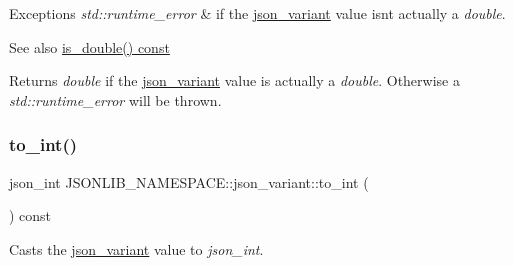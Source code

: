\begin{DoxyExceptions}{Exceptions}
{\em std\+::runtime\+\_\+error} & if the \hyperlink{classJSONLIB__NAMESPACE_1_1json__variant}{json\+\_\+variant} value isn\textquotesingle{}t actually a {\itshape double}. \\
\hline
\end{DoxyExceptions}
\begin{DoxySeeAlso}{See also}
\hyperlink{classJSONLIB__NAMESPACE_1_1json__variant_a7f294ce9b078aca12e0f96df7275ff0b}{is\+\_\+double() const} 
\end{DoxySeeAlso}
\begin{DoxyReturn}{Returns}
{\itshape double} if the \hyperlink{classJSONLIB__NAMESPACE_1_1json__variant}{json\+\_\+variant} value is actually a {\itshape double}. Otherwise a {\itshape std\+::runtime\+\_\+error} will be thrown. 
\end{DoxyReturn}
\mbox{\label{classJSONLIB__NAMESPACE_1_1json__variant_a8f30debf624e1a9d6cdc8aed8f7bda3d}} 
\subsubsection{\texorpdfstring{to\+\_\+int()}{to\_int()}\hspace{0.1cm}{\footnotesize\ttfamily [1/2]}}
{\footnotesize\ttfamily json\+\_\+int J\+S\+O\+N\+L\+I\+B\+\_\+\+N\+A\+M\+E\+S\+P\+A\+C\+E\+::json\+\_\+variant\+::to\+\_\+int (\begin{DoxyParamCaption}{ }\end{DoxyParamCaption}) const}



Casts the \hyperlink{classJSONLIB__NAMESPACE_1_1json__variant}{json\+\_\+variant} value to {\itshape json\+\_\+int}. 


